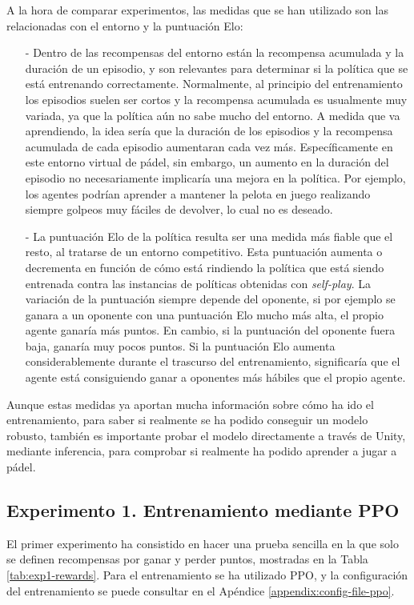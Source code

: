 A la hora de comparar experimentos, las medidas que se han utilizado son las relacionadas con el entorno y la puntuación Elo:
\begin{enumerate}
    \item[-] Dentro de las recompensas del entorno están la recompensa acumulada y la duración de un episodio, y son relevantes para determinar si la política que se está entrenando correctamente. Normalmente, al principio del entrenamiento los episodios suelen ser cortos y la recompensa acumulada es usualmente muy variada, ya que la política aún no sabe mucho del entorno. A medida que va aprendiendo, la idea sería que la duración de los episodios y la recompensa acumulada de cada episodio aumentaran cada vez más. Específicamente en este entorno virtual de pádel, sin embargo, un aumento en la duración del episodio no necesariamente implicaría una mejora en la política. Por ejemplo, los agentes podrían aprender a mantener la pelota en juego realizando siempre golpeos muy fáciles de devolver, lo cual no es deseado.
    \item[-]  La puntuación Elo de la política resulta ser una medida más fiable que el resto, al tratarse de un entorno competitivo. Esta puntuación aumenta o decrementa en función de cómo está rindiendo la política que está siendo entrenada contra las instancias de políticas obtenidas con \emph{self-play}. La variación de la puntuación siempre depende del oponente, si por ejemplo se ganara a un oponente con una puntuación Elo mucho más alta, el propio agente ganaría más puntos. En cambio, si la puntuación del oponente fuera baja, ganaría muy pocos puntos. Si la puntuación Elo aumenta considerablemente durante el trascurso del entrenamiento, significaría que el agente está consiguiendo ganar a oponentes más hábiles que el propio agente.
\end{enumerate}

Aunque estas medidas ya aportan mucha información sobre cómo ha ido el entrenamiento, para saber si realmente se ha podido conseguir un modelo robusto, también es importante probar el modelo directamente a través de Unity, mediante inferencia, para comprobar si realmente ha podido aprender a jugar a pádel.

\newpage

\subsection{Experimento 1. Entrenamiento mediante PPO}

El primer experimento ha consistido en hacer una prueba sencilla en la que solo se definen recompensas por ganar y perder puntos, mostradas en la Tabla \ref{tab:exp1-rewards}. Para el entrenamiento se ha utilizado PPO, y la configuración del entrenamiento se puede consultar en el Apéndice \ref{appendix:config-file-ppo}.

